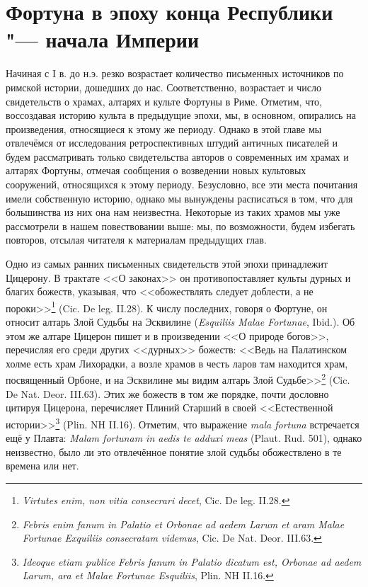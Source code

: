 \chapter{Фортуна в эпоху конца Республики "--- начала Империи}

Начиная с I в. до н.э. резко возрастает количество письменных источников по римской истории, дошедших до нас. Соответственно, возрастает и число свидетельств о храмах, алтарях и культе Фортуны в Риме. Отметим, что, воссоздавая историю культа в предыдущие эпохи, мы, в основном, опирались на произведения, относящиеся к этому же периоду. Однако в этой главе мы отвлечёмся от исследования ретроспективных штудий античных писателей и будем рассматривать только свидетельства авторов о современных им храмах и алтарях Фортуны, отмечая сообщения о возведении новых культовых сооружений, относящихся к этому периоду. Безусловно, все эти места почитания имели собственную историю, однако мы вынуждены расписаться в том, что для большинства из них она нам неизвестна. Некоторые из таких храмов мы уже рассмотрели в нашем повествовании выше: мы, по возможности, будем избегать повторов, отсылая читателя к материалам предыдущих глав.


Одно из самых ранних письменных свидетельств этой эпохи принадлежит Цицерону. В трактате <<О законах>> он противопоставляет культы дурных и благих божеств, указывая, что <<обожествлять следует доблести, а не пороки>>\footnote{\textit{Virtutes enim, non vitia consecrari decet}, Cic. De leg. II.28.} (Cic. De leg. II.28). К числу последних, говоря о Фортуне, он относит алтарь Злой Судьбы на Эсквилине (\textit{Esquiliis Malae Fortunae}, Ibid.). Об этом же алтаре Цицерон пишет и в произведении <<О природе богов>>, перечисляя его среди других <<дурных>> божеств: <<Ведь на Палатинском холме есть храм Лихорадки, а возле храмов в честь ларов там находится храм, посвященный Орбоне, и на Эсквилине мы видим алтарь Злой Судьбе>>\footnote{\textit{Febris enim fanum in Palatio et Orbonae ad aedem Larum et aram Malae Fortunae Exquiliis consecratam videmus}, Cic. De Nat. Deor. III.63.} (Cic. De Nat. Deor. III.63). Этих же божеств в том же порядке, почти дословно цитируя Цицерона, перечисляет Плиний Старший в своей <<Естественной истории>>\footnote{\textit{Ideoque etiam publice Febris fanum in Palatio dicatum est, Orbonae ad aedem Larum, ara et Malae Fortunae Esquiliis}, Plin. NH II.16.} (Plin. NH II.16). Отметим, что выражение \textit{mala fortuna} встречается ещё у Плавта: \textit{Malam fortunam in aedis te adduxi meas} (Plaut. Rud. 501), однако неизвестно, было ли это отвлечённое понятие злой судьбы обожествлено в те времена или нет.

